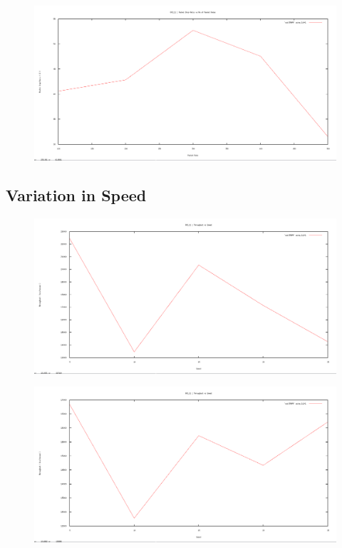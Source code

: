 \documentclass[12pt]{article}
\begin{document}
\begin{figure}[H]
	\centering
	\includegraphics[scale=	0.26]{image/apics/am_packetdropratio_vs_packetrates.png}
\end{figure}





\subsection{Variation in Speed}
\newpage

\begin{figure}[H]
	\centering
	\includegraphics[scale=	0.26]{image/bpics/bm_Throughput_vs_speed.png}
\end{figure}

\begin{figure}[H]
	\centering
	\includegraphics[scale=	0.26]{image/apics/am_Throughput_vs_speed.png}
\end{figure}
\end{document}

